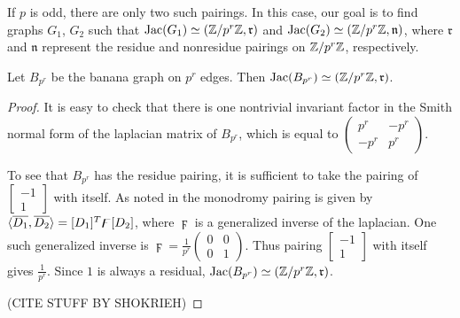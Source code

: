 \documentclass{amsart}
\begin{document}
If $p$ is odd, there are only two such pairings. In this case, our
goal is to find graphs $G_1$, $G_2$ such that $\operatorname{Jac}(G_1) \simeq
(\mathbb{Z}/p^r\mathbb{Z}, \mathfrak{r})$ and $\operatorname{Jac}(G_2) \simeq (\mathbb{Z}/p^r\mathbb{Z},
\mathfrak{n})$, where $\mathfrak{r}$ and $\mathfrak{n}$ represent the
residue and nonresidue pairings on $\mathbb{Z}/p^r\mathbb{Z}$, respectively. 

\begin{prop}
  \label{prop:banana_residue}
  Let $B_{p^r}$ be the banana graph on $p^r$ edges. Then
  $\operatorname{Jac}(B_{p^r}) \simeq (\mathbb{Z}/p^r\mathbb{Z}, \mathfrak{r})$.
\end{prop}

\begin{proof}

It is easy to check that there is one nontrivial invariant factor in the Smith normal form of the laplacian matrix of $B_{p^r}$, which is equal to $\left(\begin{array}{cc}p^{r}&-p^r\\-p^r&p^r\end{array}\right)$.

 To see that $B_{p^r}$ has the residue pairing, it is sufficient to take the pairing of $\left[\begin{array}{c}-1\\1\end{array}\right]$ with itself. As noted in %
the monodromy pairing is given by $\langle \overline{D_1}, \overline{D_{2}} \rangle=[D_1]^{T}\digamma[D_2]$, where $\digamma$ is a generalized inverse of the laplacian. One such generalized inverse is $\digamma=\frac{1}{p^{r}}\left(\begin{array}{cc}0&0\\0&1\end{array}\right)$. Thus pairing $\left[\begin{array}{c}-1\\1\end{array}\right]$ with itself gives $\frac{1}{p^{r}}$. Since $1$ is always a residual, $\operatorname{Jac}(B_{p^r}) \simeq (\mathbb{Z}/p^r\mathbb{Z}, \mathfrak{r})$.

(CITE STUFF BY SHOKRIEH)
\end{proof}
\end{document}
